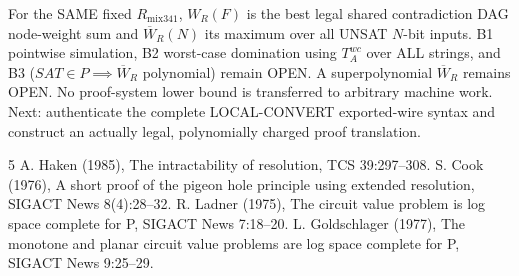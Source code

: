 \documentclass[11pt]{article}
\begin{document}
For the SAME fixed $R_{\mathrm{mix341}}$, $W_R(F)$ is the best legal shared contradiction DAG node-weight sum and $\overline W_R(N)$ its maximum over all UNSAT $N$-bit inputs. B1 pointwise simulation, B2 worst-case domination using $T_A^{wc}$ over ALL strings, and B3 ($SAT\in P\implies\overline W_R$ polynomial) remain OPEN. A superpolynomial $\overline W_R$ remains OPEN. No proof-system lower bound is transferred to arbitrary machine work. Next: authenticate the complete LOCAL-CONVERT exported-wire syntax and construct an actually legal, polynomially charged proof translation.

\begin{thebibliography}{5}
 A. Haken (1985), The intractability of resolution, TCS 39:297--308.
 S. Cook (1976), A short proof of the pigeon hole principle using extended resolution, SIGACT News 8(4):28--32.
 R. Ladner (1975), The circuit value problem is log space complete for P, SIGACT News 7:18--20.
 L. Goldschlager (1977), The monotone and planar circuit value problems are log space complete for P, SIGACT News 9:25--29.
\end{thebibliography}
\end{document}
